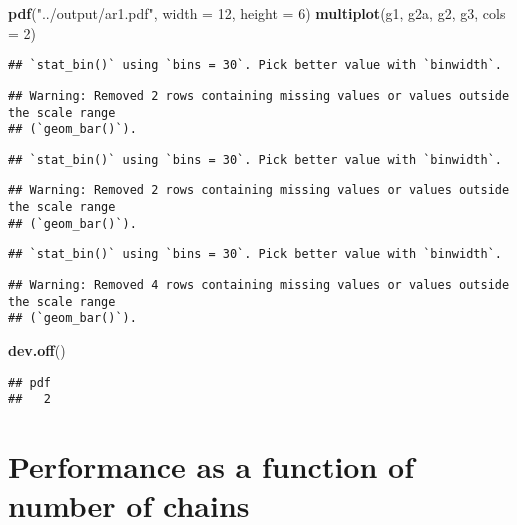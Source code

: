 \documentclass[
]{article}
\newenvironment{Shaded}{\begin{snugshade}}{\end{snugshade}}
\newcommand{\AttributeTok}[1]{\textcolor[rgb]{0.13,0.29,0.53}{#1}}
\newcommand{\DecValTok}[1]{\textcolor[rgb]{0.00,0.00,0.81}{#1}}
\newcommand{\FunctionTok}[1]{\textcolor[rgb]{0.13,0.29,0.53}{\textbf{#1}}}
\newcommand{\NormalTok}[1]{#1}
\newcommand{\StringTok}[1]{\textcolor[rgb]{0.31,0.60,0.02}{#1}}
\begin{document}
\begin{Shaded}
\begin{Highlighting}[]
\FunctionTok{pdf}\NormalTok{(}\StringTok{"../output/ar1.pdf"}\NormalTok{, }\AttributeTok{width =} \DecValTok{12}\NormalTok{, }\AttributeTok{height =} \DecValTok{6}\NormalTok{)}
\FunctionTok{multiplot}\NormalTok{(g1, g2a, g2, g3, }\AttributeTok{cols =} \DecValTok{2}\NormalTok{)}
\end{Highlighting}
\end{Shaded}

\begin{verbatim}
## `stat_bin()` using `bins = 30`. Pick better value with `binwidth`.
\end{verbatim}

\begin{verbatim}
## Warning: Removed 2 rows containing missing values or values outside the scale range
## (`geom_bar()`).
\end{verbatim}

\begin{verbatim}
## `stat_bin()` using `bins = 30`. Pick better value with `binwidth`.
\end{verbatim}

\begin{verbatim}
## Warning: Removed 2 rows containing missing values or values outside the scale range
## (`geom_bar()`).
\end{verbatim}

\begin{verbatim}
## `stat_bin()` using `bins = 30`. Pick better value with `binwidth`.
\end{verbatim}

\begin{verbatim}
## Warning: Removed 4 rows containing missing values or values outside the scale range
## (`geom_bar()`).
\end{verbatim}

\begin{Shaded}
\begin{Highlighting}[]
\FunctionTok{dev.off}\NormalTok{()}
\end{Highlighting}
\end{Shaded}

\begin{verbatim}
## pdf 
##   2
\end{verbatim}

\section{Performance as a function of number of
chains}\label{performance-as-a-function-of-number-of-chains}
\end{document}
